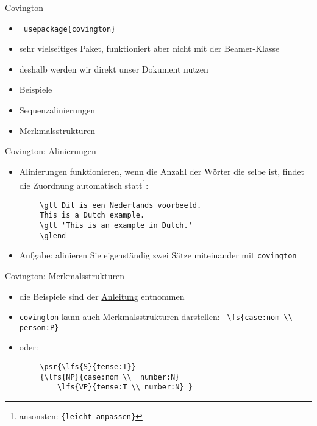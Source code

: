 \begin{frame}[fragile]{Covington}
    \begin{itemize}[<+->]
        \item  \lstinline| usepackage{covington} |
        \item sehr vielseitiges Paket, funktioniert aber nicht mit der Beamer-Klasse
        \item deshalb werden wir direkt unser Dokument nutzen
        \item Beispiele
        \item Sequenzalinierungen
        \item Merkmalsstrukturen
    \end{itemize}
\end{frame}

\begin{frame}[fragile]{Covington: Alinierungen}
    \begin{itemize}[<+->]
        \item Alinierungen funktionieren, wenn die Anzahl der Wörter die selbe ist, findet die Zuordnung automatisch statt\footnote{ansonsten: \texttt{\{leicht anpassen\}}}:
    \end{itemize}
    \begin{lstlisting}
        \gll Dit is een Nederlands voorbeeld.
        This is a Dutch example.
        \glt 'This is an example in Dutch.'
        \glend
    \end{lstlisting}
    \begin{itemize}
        \item Aufgabe: alinieren Sie eigenständig zwei Sätze miteinander mit \texttt{covington}
    \end{itemize}
\end{frame}

\begin{frame}[fragile]{Covington: Merkmalsstrukturen}
    \begin{itemize}[<+->]
        \item die Beispiele sind der \href{ftp://ftp.dante.de/tex-archive/macros/latex/contrib/covington/covington.pdf}{Anleitung} entnommen
        \item \texttt{covington} kann auch Merkmalsstrukturen darstellen: \lstinline| \fs{case:nom \\ person:P} |
        \item oder:
    \end{itemize}
    \begin{lstlisting}
        \psr{\lfs{S}{tense:T}}
        {\lfs{NP}{case:nom \\  number:N}
            \lfs{VP}{tense:T \\ number:N} }
    \end{lstlisting}
\end{frame}


